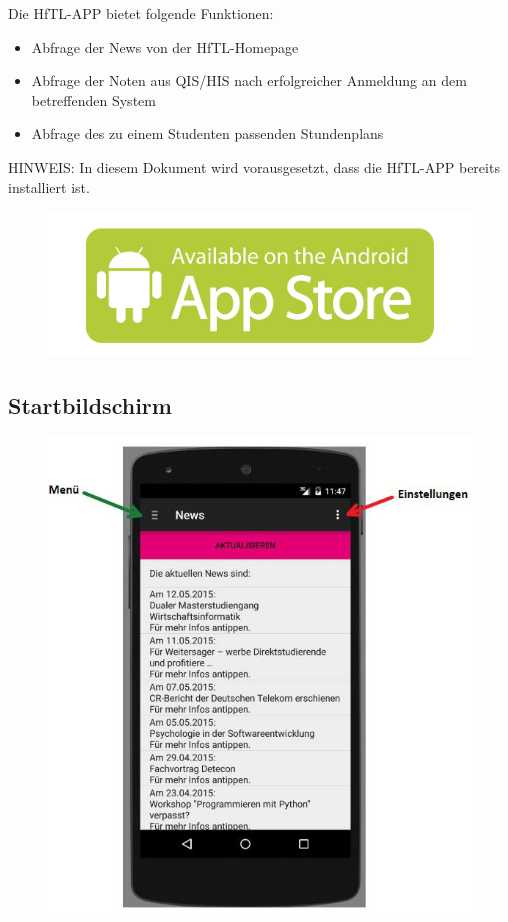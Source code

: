 Die HfTL-APP bietet folgende Funktionen:

\begin{itemize}
\item Abfrage der News von der HfTL-Homepage
\item Abfrage der Noten aus QIS/HIS nach erfolgreicher Anmeldung an dem betreffenden System
\item Abfrage des zu einem Studenten passenden Stundenplans
\end{itemize}

HINWEIS: In diesem Dokument wird vorausgesetzt, dass die HfTL-APP bereits installiert ist.
\begin{figure}[h]
	\centering
	\includegraphics[scale=0.5]{03_Bedienungsanleitung/img/appstore.jpg}
	\label{img:grafik-dummy}
\end{figure}

\newpage

\subsection{Startbildschirm}


\begin{figure}[h]
	\centering
	\includegraphics[scale=0.8]{03_Bedienungsanleitung/img/start2.jpg}
	\label{img:grafik-dummy}
\end{figure}

